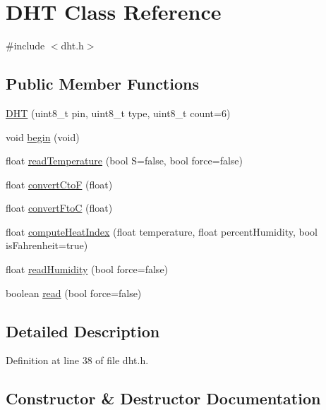 \hypertarget{class_d_h_t}{}\section{D\+HT Class Reference}
\label{class_d_h_t}


{\ttfamily \#include $<$dht.\+h$>$}

\subsection*{Public Member Functions}
\begin{DoxyCompactItemize}
\item 
\hyperlink{class_d_h_t_afa429167bfeba848ab824fee0043f79d}{D\+HT} (uint8\+\_\+t pin, uint8\+\_\+t type, uint8\+\_\+t count=6)
\item 
void \hyperlink{class_d_h_t_a757dc4b34611c08168248b276e4f84a8}{begin} (void)
\item 
float \hyperlink{class_d_h_t_a68be09105aa7d831bb473c9d774918cf}{read\+Temperature} (bool S=false, bool force=false)
\item 
float \hyperlink{class_d_h_t_a582df4d39cd56b4acbd47fbe75aedcc3}{convert\+CtoF} (float)
\item 
float \hyperlink{class_d_h_t_a90530e38a2f47893e4767dda1d00d2a4}{convert\+FtoC} (float)
\item 
float \hyperlink{class_d_h_t_a0d23921017e3d827e49bfd136b40a6aa}{compute\+Heat\+Index} (float temperature, float percent\+Humidity, bool is\+Fahrenheit=true)
\item 
float \hyperlink{class_d_h_t_a5f8c84378abe4eeecf34f09e2cdf90a0}{read\+Humidity} (bool force=false)
\item 
boolean \hyperlink{class_d_h_t_a3f36687c0c3dc3978384e7524ee46f24}{read} (bool force=false)
\end{DoxyCompactItemize}


\subsection{Detailed Description}


Definition at line 38 of file dht.\+h.



\subsection{Constructor \& Destructor Documentation}
